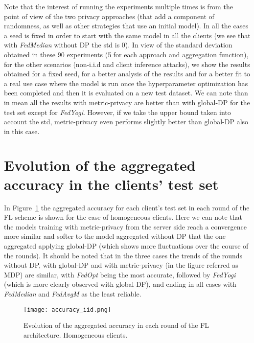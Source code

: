 \documentclass[5p,times]{elsarticle}
\begin{document}
Note that the interest of running the experiments multiple times is from the point of view of the two privacy approaches (that add a component of randomness, as well as other strategies that use an initial model). In all the cases a seed is fixed in order to start with the same model in all the clients (we see that with \textit{FedMedian} without DP the std is 0). In view of the standard deviation obtained in these 90 experiments (5 for each approach and aggregation function), for the other scenarios (non-i.i.d and client inference attacks), we show the results obtained for a fixed seed, for a better analysis of the results and for a better fit to a real use case where the model is run once the hyperparameter optimization has been completed and then it is evaluated on a new test dataset. We can note than in mean all the results with metric-privacy are better than with global-DP for the test set except for \textit{FedYogi}. However, if we take the upper bound taken into account the std, metric-privacy even performs slightly better than global-DP also in this case. 


\section{Evolution of the aggregated accuracy in the clients' test set}\label{sec:agg_accuracy}

In Figure~\ref{fig:accuracy_iid} the aggregated accuracy for each client's test set in each round of the FL scheme is shown for the case of homogeneous clients. Here we can note that the models training with metric-privacy from the server side reach a convergence more similar and softer to the model aggregated without DP that the one aggregated applying global-DP (which shows more fluctuations over the course of the rounds). It should be noted that in the three cases the trends of the rounds without DP, with global-DP and with metric-privacy (in the figure referred as MDP) are similar, with \textit{FedOpt} being the most accurate, followed by \textit{FedYogi} (which is more clearly observed with global-DP), and ending in all cases with \textit{FedMedian} and \textit{FedAvgM} as the least reliable.
\begin{figure}[ht]
    \centering
    \texttt{[image: accuracy\_iid.png]}
    \caption{Evolution of the aggregated accuracy in each round of the FL architecture. Homogeneous clients.}
    \label{fig:accuracy_iid}
\end{figure}
\end{document}
